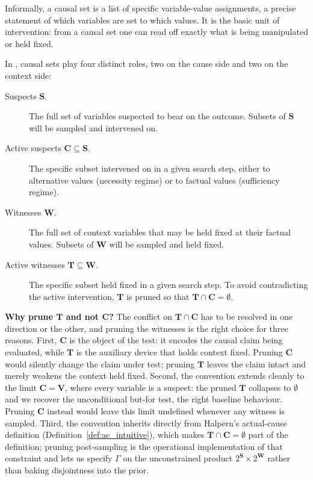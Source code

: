\medskip\noindent Informally, a causal set is a list of specific variable-value
assignments, a precise statement of which variables are set to which values. It is the
basic unit of intervention: from a causal set one can read off exactly what is being
manipulated or held fixed.

In \ourapproach, causal sets play four distinct roles, two on the cause side and two
on the context side:

\begin{description}
\item[Suspects $\mathbf{S}$.] The full set of variables suspected to bear on the
outcome. Subsets of $\mathbf{S}$ will be sampled and intervened on.
\item[Active suspects $\mathbf{C} \subseteq \mathbf{S}$.] The specific subset
intervened on in a given search step, either to alternative values (necessity
regime) or to factual values (sufficiency regime).
\item[Witnesses $\mathbf{W}$.] The full set of context variables that may be held fixed
at their factual values. Subsets of $\mathbf{W}$ will be sampled and held fixed.
\item[Active witnesses $\mathbf{T} \subseteq \mathbf{W}$.] The specific subset held
fixed in a given search step. To avoid contradicting the active intervention,
$\mathbf{T}$ is pruned so that $\mathbf{T} \cap \mathbf{C} = \emptyset$.
\end{description}

\medskip\noindent
\textbf{Why prune $\mathbf{T}$ and not $\mathbf{C}$?}
The conflict on $\mathbf{T} \cap \mathbf{C}$ has to be resolved in one
direction or the other, and pruning the witnesses is the right choice for
three reasons.
First, $\mathbf{C}$ is the object of the test: it encodes the causal claim
being evaluated, while $\mathbf{T}$ is the auxiliary device that holds
context fixed.
Pruning $\mathbf{C}$ would silently change the claim under test; pruning
$\mathbf{T}$ leaves the claim intact and merely weakens the context held fixed.
Second, the convention extends cleanly to the limit $\mathbf{C} = \mathbf{V}$,
where every variable is a suspect: the pruned $\mathbf{T}$ collapses to
$\emptyset$ and we recover the unconditional but-for test, the right
baseline behaviour.
Pruning $\mathbf{C}$ instead would leave this limit undefined whenever any
witness is sampled.
Third, the convention inherits directly from Halpern's actual-cause
definition (Definition~\ref{def:ac_intuitive}), which makes
$\mathbf{T} \cap \mathbf{C} = \emptyset$ part of the definition;
pruning post-sampling is the operational implementation of that constraint
and lets us specify $\Gamma$ on the unconstrained product
$2^{\mathbf{S}} \times 2^{\mathbf{W}}$ rather than baking disjointness into
the prior.

